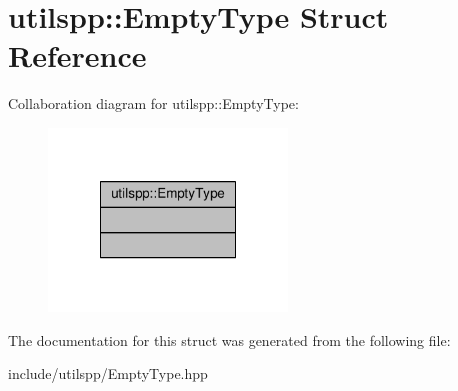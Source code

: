 \hypertarget{structutilspp_1_1EmptyType}{\section{utilspp\-:\-:Empty\-Type Struct Reference}
\label{structutilspp_1_1EmptyType}
}


Collaboration diagram for utilspp\-:\-:Empty\-Type\-:
\nopagebreak
\begin{figure}[H]
\begin{center}
\leavevmode
\includegraphics[width=180pt]{structutilspp_1_1EmptyType__coll__graph}
\end{center}
\end{figure}


The documentation for this struct was generated from the following file\-:\begin{DoxyCompactItemize}
\item 
include/utilspp/Empty\-Type.\-hpp\end{DoxyCompactItemize}
